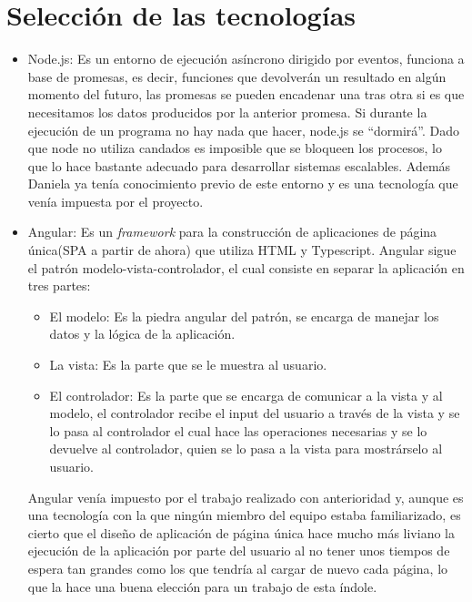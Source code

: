 \documentclass[11pt]{article}
\begin{document}
\section{Selección de las tecnologías}
\begin{itemize}
	\item Node.js: Es un entorno de ejecución asíncrono dirigido por eventos, funciona a base de promesas, es decir, funciones que devolverán un resultado en algún momento del futuro, las promesas se pueden encadenar una tras otra si es que necesitamos los datos producidos por la anterior promesa. Si durante la ejecución de un programa no hay nada que hacer, node.js se “dormirá”. 
	Dado que node no utiliza candados es imposible que se bloqueen los procesos, lo que lo hace bastante adecuado para desarrollar sistemas escalables. Además Daniela ya tenía conocimiento previo de este entorno y es una tecnología que venía impuesta por el proyecto.
	
	\item Angular: Es un \emph{framework} para la construcción de aplicaciones de página única(SPA a partir de ahora) que utiliza HTML y Typescript. Angular sigue el patrón modelo-vista-controlador, el cual consiste en separar la aplicación en tres partes:
	\begin{itemize}
		\item El modelo: Es la piedra angular del patrón, se encarga de manejar los datos y la lógica de la aplicación.
		\item La vista: Es la parte que se le muestra al usuario.
		\item El controlador: Es la parte que se encarga de comunicar a la vista y al modelo, el controlador recibe el input del usuario a través de la vista y se lo pasa al controlador el cual hace las operaciones necesarias y se lo devuelve al controlador, quien se lo pasa a la vista para mostrárselo al usuario.
	\end{itemize}
	
	
	Angular venía impuesto por el trabajo realizado con anterioridad y, aunque es una tecnología con la que ningún miembro del equipo  estaba familiarizado, es cierto que el diseño de aplicación de página única hace mucho más liviano la ejecución de la aplicación por parte del usuario al no tener unos tiempos de espera tan grandes como los que tendría al cargar de nuevo cada página, lo que la hace una buena elección para un trabajo de esta índole.
	

\end{itemize}
\end{document}
